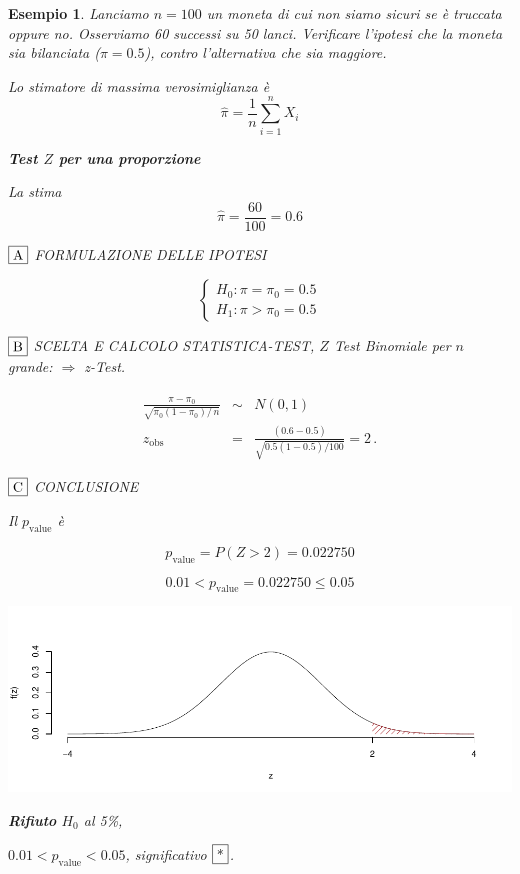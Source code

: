 \documentclass[
  11pt,
]{book}
\theoremstyle{mytheoremstyle}
\theoremstyle{mydefstyle}
\newtheorem{example}{{Esempio}}[section]
\begin{document}
\begin{example}
Lanciamo \(n=100\) un moneta di cui non siamo sicuri se è truccata oppure
no. Osserviamo 60 successi su 50 lanci. Verificare l'ipotesi che la moneta sia bilanciata (\(\pi=0.5\)), contro
l'alternativa che sia maggiore.

Lo stimatore di massima verosimiglianza è
\[\hat\pi=\frac 1 n \sum_{i=1}^n X_i\]

\textbf{Test \(Z\) per una proporzione}

La stima
\[\hat\pi=\frac { 60 } { 100 }= 0.6  \]

\(\fbox{A}\) FORMULAZIONE DELLE IPOTESI

\[\begin{cases}
   H_0: \pi = \pi_0=0.5 \\
   H_1: \pi > \pi_0=0.5 
   \end{cases}\]

\(\fbox{B}\) SCELTA E CALCOLO STATISTICA-TEST, \(Z\)
Test Binomiale per \(n\) grande: \(\Rightarrow\) z-Test.

\begin{eqnarray*}
   \frac{\hat\pi - \pi_{0}} {\sqrt {\pi_0(1-\pi_0)/\,n}}&\sim&N(0,1)\\
   z_{\text{obs}}
   &=& \frac{ ( 0.6 -  0.5 )} {\sqrt{ 0.5 (1- 0.5 )/ 100 }}
   =   2 \,.
   \end{eqnarray*}

\(\fbox{C}\) CONCLUSIONE

Il \(p_{\text{value}}\) è

\[ p_{\text{value}} = P(Z>2)=0.022750 \]

\[
 0.01 < p_\text{value}= 0.022750 \leq 0.05 
\]

\begin{center}\includegraphics{Appunti_di_Statistica_2025_files/figure-latex/15-test-mu-pi-10,-1} \end{center}

\textbf{Rifiuto} \(H_0\) al 5\%,

\(0.01<p_\text{value}<0.05\), \emph{significativo} \(\fbox{*}\).
\end{example}
\end{document}
